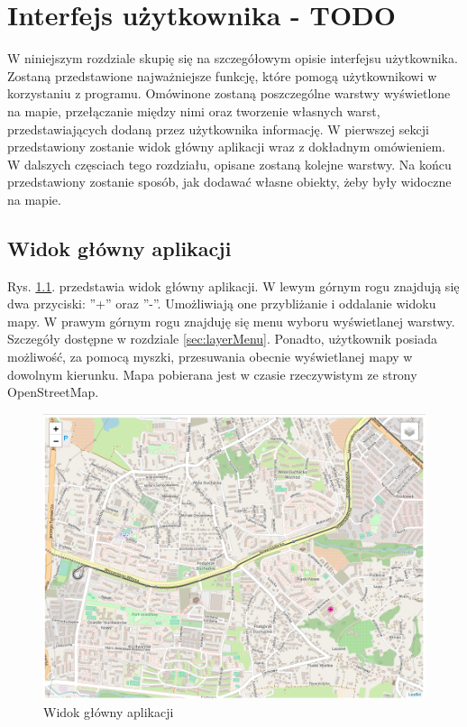 \chapter{Interfejs użytkownika - TODO}
\label{cha:UI}
W niniejszym rozdziale skupię się na szczegółowym opisie interfejsu użytkownika. Zostaną przedstawione najważniejsze funkcję, które pomogą użytkownikowi w korzystaniu z programu. Omówinone zostaną poszczególne warstwy wyświetlone na mapie, przełączanie między nimi oraz tworzenie własnych warst, przedstawiających dodaną przez użytkownika informację. W pierwszej sekcji przedstawiony zostanie widok główny aplikacji wraz z dokładnym omówieniem. W dalszych częsciach tego rozdziału, opisane zostaną kolejne warstwy. Na końcu przedstawiony zostanie sposób, jak dodawać własne obiekty, żeby były widoczne na mapie.
\newpage
\section{Widok główny aplikacji}
\label{sec:mainView}

Rys. \ref{mainView}. przedstawia widok główny aplikacji. W lewym górnym rogu znajdują się dwa przyciski: ''+'' oraz ''-''. Umożliwiają one przybliżanie i oddalanie widoku mapy. W prawym górnym rogu znajduję się menu wyboru wyświetlanej warstwy. Szczegóły dostępne w rozdziale \ref{sec:layerMenu}. Ponadto, użytkownik posiada możliwość, za pomocą myszki, przesuwania obecnie wyświetlanej mapy w dowolnym kierunku. Mapa pobierana jest w czasie rzeczywistym ze strony OpenStreetMap.

\begin{figure}[h]
\caption{Widok główny aplikacji}
\label{mainView}
\centering
\includegraphics[width=1.1\textwidth]{mainScreen}
\end{figure}

